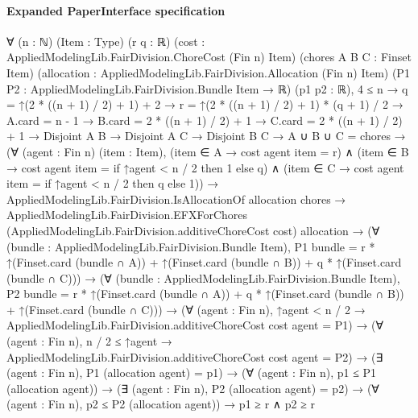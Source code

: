 \documentclass[10pt]{article}
\begin{document}
\paragraph{Expanded PaperInterface specification}
\begin{ReviewVerbatim}
∀ (n : ℕ) (Item : Type) (r q : ℝ) (cost : AppliedModelingLib.FairDivision.ChoreCost (Fin n) Item)
  (chores A B C : Finset Item) (allocation : AppliedModelingLib.FairDivision.Allocation (Fin n) Item)
  (P1 P2 : AppliedModelingLib.FairDivision.Bundle Item → ℝ) (p1 p2 : ℝ),
  4 ≤ n →
    q = ↑(2 * ((n + 1) / 2) + 1) + 2 →
      r = ↑(2 * ((n + 1) / 2) + 1) * (q + 1) / 2 →
        A.card = n - 1 →
          B.card = 2 * ((n + 1) / 2) + 1 →
            C.card = 2 * ((n + 1) / 2) + 1 →
              Disjoint A B →
                Disjoint A C →
                  Disjoint B C →
                    A ∪ B ∪ C = chores →
                      (∀ (agent : Fin n) (item : Item),
                          (item ∈ A → cost agent item = r) ∧
                            (item ∈ B → cost agent item = if ↑agent < n / 2 then 1 else q) ∧
                              (item ∈ C → cost agent item = if ↑agent < n / 2 then q else 1)) →
                        AppliedModelingLib.FairDivision.IsAllocationOf allocation chores →
                          AppliedModelingLib.FairDivision.EFXForChores
                              (AppliedModelingLib.FairDivision.additiveChoreCost cost) allocation →
                            (∀ (bundle : AppliedModelingLib.FairDivision.Bundle Item),
                                P1 bundle =
                                  r * ↑(Finset.card (bundle ∩ A)) + ↑(Finset.card (bundle ∩ B)) +
                                    q * ↑(Finset.card (bundle ∩ C))) →
                              (∀ (bundle : AppliedModelingLib.FairDivision.Bundle Item),
                                  P2 bundle =
                                    r * ↑(Finset.card (bundle ∩ A)) + q * ↑(Finset.card (bundle ∩ B)) +
                                      ↑(Finset.card (bundle ∩ C))) →
                                (∀ (agent : Fin n),
                                    ↑agent < n / 2 →
                                      AppliedModelingLib.FairDivision.additiveChoreCost cost agent = P1) →
                                  (∀ (agent : Fin n),
                                      n / 2 ≤ ↑agent →
                                        AppliedModelingLib.FairDivision.additiveChoreCost cost agent = P2) →
                                    (∃ (agent : Fin n), P1 (allocation agent) = p1) →
                                      (∀ (agent : Fin n), p1 ≤ P1 (allocation agent)) →
                                        (∃ (agent : Fin n), P2 (allocation agent) = p2) →
                                          (∀ (agent : Fin n), p2 ≤ P2 (allocation agent)) → p1 ≥ r ∧ p2 ≥ r
\end{ReviewVerbatim}
\end{document}
